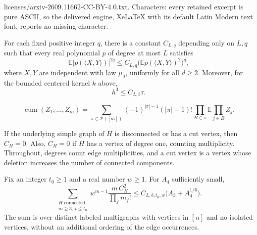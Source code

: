 \documentclass[10pt,a4paper]{amsart}
\DeclareMathOperator{\cum}{cum}
\begin{document}
licenses/arxiv-2609.11662-CC-BY-4.0.txt. Characters: every retained excerpt is pure ASCII, so the delivered engine, XeLaTeX with its default Latin Modern text font, reports no missing character.
\begin{lemma}\label{lem:moments}
For each fixed positive integer $q$, there is a constant $C_{L,q}$ depending only on $L,q$
such that every real polynomial $p$ of degree at most $L$ satisfies
\[
 \mathbb E|p(\langle X,Y\rangle)|^{2q}
 \le C_{L,q}\bigl(\mathbb E p(\langle X,Y\rangle)^2\bigr)^q,
\]
where $X,Y$ are independent with law $\mu_d$, uniformly for all $d\ge2$.
Moreover, for the bounded centered kernel $k$ above,
\begin{equation}\label{eq:h-cube}
 h^3\le C_{L,b}\tau.
\end{equation}
\end{lemma}

\begin{equation}\label{eq:cumulant-def}
 \cum(Z_1,\ldots,Z_m)
 =\sum_{\pi\in\mathcal P([m])}(-1)^{|\pi|-1}(|\pi|-1)!
      \prod_{B\in\pi}\mathbb E\prod_{j\in B}Z_j.
\end{equation}

\begin{lemma}\label{lem:cut}
If the underlying simple graph of $H$ is disconnected or has a cut vertex, then $C_H=0$.
Also, $C_H=0$ if $H$ has a vertex of degree one, counting multiplicity.
Throughout, degrees count edge multiplicities, and a cut vertex is a vertex whose deletion increases the number of connected components.
\end{lemma}

\begin{lemma}\label{lem:core-sum}
Fix an integer $t_0\ge1$ and a real number $w\ge1$. For $A_4$ sufficiently small,
\begin{equation}\label{eq:core-sum}
 \sum_{\substack{H\text{ connected}\\m\ge3,\ t\le t_0}}
       w^{m-1}\frac{m\,C_H^2}{\prod_fm_f!}
 \le C_{L,b,t_0,w}\bigl(A_3+A_4^{1/6}\bigr).
\end{equation}
The sum is over distinct labeled multigraphs with vertices in $[n]$ and no isolated vertices,
without an additional ordering of the edge occurrences.
\end{lemma}
\end{document}
